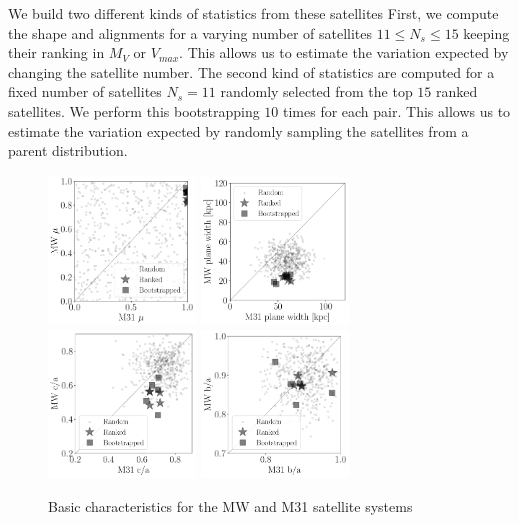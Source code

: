 \documentclass[a4paper,fleqn,usenatbib]{mnras}
\begin{document}
We build two different kinds of statistics from these satellites
First, we compute the shape and alignments for a varying number of
satellites $11\leq N_{s}\leq 15$ keeping their ranking in
$M_V$ or $V_{max}$. 
This allows us to estimate the variation expected by changing the
satellite number. 
The second kind of statistics are computed for a fixed number of
satellites $N_{s}=11$ randomly selected from the top $15$ ranked
satellites. 
We perform this bootstrapping $10$ times for each pair. 
This allows us to estimate the variation expected by randomly sampling
the satellites from a parent distribution.






\begin{figure}
\centering
\includegraphics[width=0.35\textwidth]{LG_scatter_mu.pdf}
\includegraphics[width=0.35\textwidth]{LG_scatter_width.pdf}
\includegraphics[width=0.35\textwidth]{LG_scatter_ca_ratio.pdf}
\includegraphics[width=0.35\textwidth]{LG_scatter_ba_ratio.pdf}
\caption{Basic characteristics for the MW and M31 satellite systems
\label{fig:lg_scatter}}
\end{figure}
\end{document}

